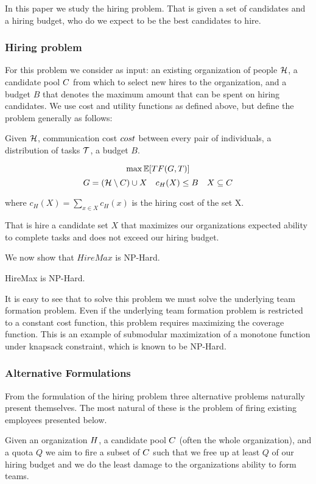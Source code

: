 In this paper we study the hiring problem. That is given a set of candidates and a hiring budget, who do we expect to be the best candidates to hire. 
\subsubsection{Hiring problem}

For this problem we consider as input: an existing organization of people $\mathcal{H}$, a candidate pool ${C}$ from which to select new hires to the organization, and a budget $B$ that denotes the maximum amount that can be spent on hiring candidates.
We use cost and utility functions as defined above, but define the problem generally as follows:
\begin{problem}
[HireMax] Given $\mathcal{H}$, communication cost $cost$ between every pair of individuals, a distribution of tasks $\mathcal{T}$, a budget $B$.

$$ \max \mathbb{E}[TF(G,T)]  $$
$$ G=(\mathcal{H} \setminus {C}) \cup X \quad c_H(X) \le B \quad X \subseteq C $$

where $c_H(X) = \sum_{x \in X} c_H(x)$ is the hiring cost of the set X.

That is hire a candidate set $X$ that maximizes our organizations expected ability to complete tasks and does not exceed our hiring budget. 
\end{problem}

We now show that $HireMax$ is NP-Hard.
\begin{theorem}
HireMax is NP-Hard.

It is easy to see that to solve this problem we must solve the underlying team formation problem. Even if the underlying team formation problem is restricted to a constant cost function, this problem requires maximizing the coverage function. This is an example of submodular maximization of a monotone function under knapsack constraint, which is known to be NP-Hard.  
\end{theorem}

\subsubsection{Alternative Formulations}

From the formulation of the hiring problem three alternative problems naturally present themselves. The most natural of these is the problem of firing existing employees presented below.  

Given an organization ${H}$, a candidate pool ${C}$ (often the whole organization), and a quota $Q$ we aim to fire a subset  of ${C}$ such that we free up at least $Q$ of our hiring budget and we do the least damage to the organizations ability to form teams.  

